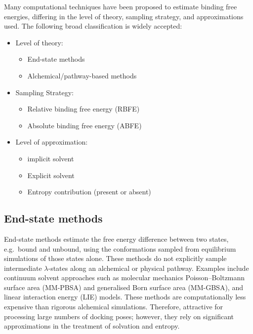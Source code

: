 \documentclass[12pt]{article}
\begin{document}
Many computational techniques have been proposed to estimate binding free energies, differing in the level of theory, sampling strategy, and approximations used. 
The following broad classification is widely accepted:
\begin{itemize}
  \item Level of theory: 
        \begin{itemize}
        \item End-state methods
        \item Alchemical/pathway-based methods
        \end{itemize}
  \item Sampling Strategy:
        \begin{itemize}
          \item Relative binding free energy (RBFE)
          \item Absolute binding free energy (ABFE)
        \end{itemize}
  \item Level of approximation:
        \begin{itemize}
          \item implicit solvent
          \item Explicit solvent
          \item Entropy contribution (present or absent)
        \end{itemize}
\end{itemize}


\subsection{End-state methods}

End-state methods estimate the free energy difference between two states, e.g.\ bound and unbound, using the conformations sampled from equilibrium simulations of those states alone. These methods do not explicitly sample intermediate $\lambda$-states along an alchemical or physical pathway. Examples include continuum solvent approaches such as molecular mechanics Poisson--Boltzmann surface area (MM-PBSA) and generalised Born surface area (MM-GBSA), and linear interaction energy (LIE) models\cite{CH10_kollman1993free,CH10_homeyer2012mmpbsa,CH10_hansson1998lie}. These methods are computationally less expensive than rigorous alchemical simulations. Therefore, attractive for processing large numbers of docking poses; however, they rely on significant approximations in the treatment of solvation and entropy. 
\end{document}
